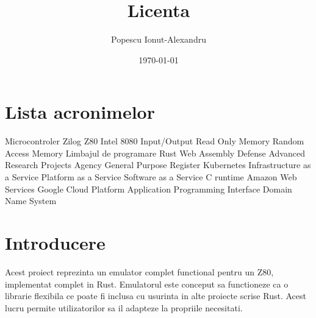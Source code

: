 \documentclass[titlepage,12pt]{article}
\begin{document}
    \title{Licenta}
    \author{Popescu Ionut-Alexandru}
    \date{\today}

    \maketitle
    \renewcommand{\contentsname}{Cuprins}
    \renewcommand{\listfigurename}{Lista figurilor}
    \renewcommand{\listtablename}{Lista tabelelor}
    \renewcommand{\figurename}{Figura}
    \renewcommand{\tablename}{Tabela}
    \renewcommand{\lstlistingname}{Cod}
    \tableofcontents
    \clearpage
    \listoffigures
    \clearpage
    \listoftables
    \clearpage
    \section*{Lista acronimelor} %
    \begin{acronym}
               {Microcontroler Zilog Z80}
             {Intel 8080}
                {Input/Output}
               {Read Only Memory}
               {Random Access Memory}
              {Limbajul de programare Rust}
              {Web Assembly}
             {Defense Advanced Research Projects Agency}
               {General Purpose Register}
               {Kubernetes}
              {Infrastructure as a Service}
              {Platform as a Service}
              {Software as a Service}
               {C runtime}
               {Amazon Web Services}
               {Google Cloud Platform}
               {Application Programming Interface}
               {Domain Name System}
    \end{acronym}
    \clearpage


    \section{Introducere}
    Acest proiect reprezinta un emulator complet functional pentru un \ac {Z80}, implementat complet in \ac {Rust}.
    Emulatorul este conceput sa functioneze ca o librarie flexibila ce poate fi inclusa cu usurinta in alte proiecte scrise Rust. Acest lucru permite utilizatorilor sa il adapteze la propriile necesitati.
\end{document}
